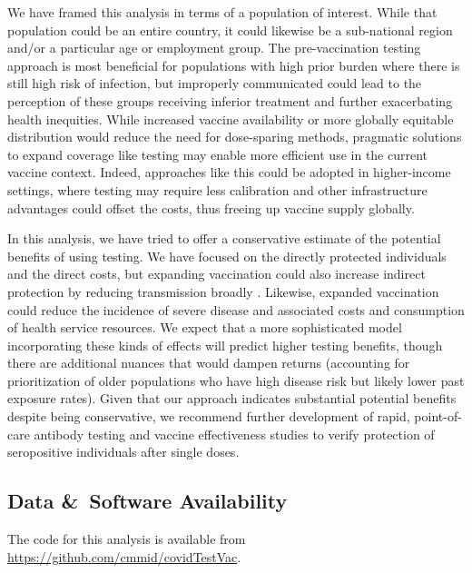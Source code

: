 \documentclass[10pt,a4paper,twocolumn]{article}
\begin{document}
We have framed this analysis in terms of a population of interest. While that population could be an entire country, it could likewise be a sub-national region and/or a particular age or employment group. The pre-vaccination testing approach is most beneficial for populations with high prior burden where there is still high risk of infection, but improperly communicated could lead to the perception of these groups receiving inferior treatment and further exacerbating health inequities. While increased vaccine availability or more globally equitable distribution would reduce the need for dose-sparing methods, pragmatic solutions to expand coverage like testing may enable more efficient use in the current vaccine context. Indeed, approaches like this could be adopted in higher-income settings, where testing may require less calibration and other infrastructure advantages could offset the costs, thus freeing up vaccine supply globally.

In this analysis, we have tried to offer a conservative estimate of the potential benefits of using testing. We have focused on the directly protected individuals and the direct costs, but expanding vaccination could also increase indirect protection by reducing transmission broadly \cite{regev-yochay_decreased_2021}. Likewise, expanded vaccination could reduce the incidence of severe disease and associated costs and consumption of health service resources. We expect that a more sophisticated model incorporating these kinds of effects will predict higher testing benefits, though there are additional nuances that would dampen returns (\eg* accounting for prioritization of older populations who have high disease risk but likely lower past exposure rates). Given that our approach indicates substantial potential benefits despite being conservative, we recommend further development of rapid, point-of-care antibody testing and vaccine effectiveness studies to verify protection of seropositive individuals after single doses.


\subsection*{Data \&\ Software Availability}
The code for this analysis is available from \href{https://github.com/cmmid/covidTestVac}{https://github.com/cmmid/covidTestVac}.
\end{document}
